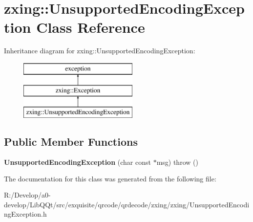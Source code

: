 \hypertarget{classzxing_1_1_unsupported_encoding_exception}{}\section{zxing\+:\+:Unsupported\+Encoding\+Exception Class Reference}
\label{classzxing_1_1_unsupported_encoding_exception}
Inheritance diagram for zxing\+:\+:Unsupported\+Encoding\+Exception\+:\begin{figure}[H]
\begin{center}
\leavevmode
\includegraphics[height=3.000000cm]{classzxing_1_1_unsupported_encoding_exception}
\end{center}
\end{figure}
\subsection*{Public Member Functions}
\begin{DoxyCompactItemize}
\item 
\mbox{\label{classzxing_1_1_unsupported_encoding_exception_a30b5bd2bbd4bc0151015863ddd6fe18e}} 
{\bfseries Unsupported\+Encoding\+Exception} (char const $\ast$msg)  throw ()
\end{DoxyCompactItemize}


The documentation for this class was generated from the following file\+:\begin{DoxyCompactItemize}
\item 
R\+:/\+Develop/a0-\/develop/\+Lib\+Q\+Qt/src/exquisite/qrcode/qrdecode/zxing/zxing/Unsupported\+Encoding\+Exception.\+h\end{DoxyCompactItemize}
